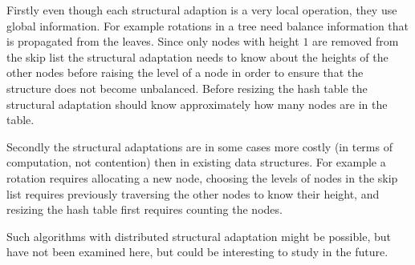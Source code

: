 Firstly even though each structural adaption is a very local operation, they use global information.
For example rotations in a tree need balance information that is propagated from the leaves.
Since only nodes with height $1$ are removed from the skip list the structural adaptation needs to know about the heights
of the other nodes before raising the level of a node in order to ensure that the structure does not become unbalanced.
Before resizing the hash table the structural adaptation should know approximately how many nodes are in the table.

Secondly the structural adaptations are in some cases more costly (in terms of computation, not contention) then in existing data structures.
For example a rotation requires allocating a new node, choosing the levels of nodes in the skip list
requires previously traversing the other nodes to know their height, and resizing the hash table first requires
counting the nodes.

Such algorithms with distributed structural adaptation might be possible, but have not been examined here, but could be
interesting to study in the future.
